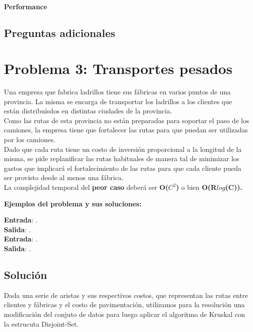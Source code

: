 \documentclass[a4paper, 10pt, twoside]{article}
\begin{document}
\paragraph{Performance}

\subsection{Preguntas adicionales}





\newpage

\section{Problema 3: Transportes pesados}

Una empresa que fabrica ladrillos tiene sus fábricas en varios puntos de una provincia. La misma se encarga de transportar los ladrillos a los clientes que están distribuísdos en distintas ciudades de la provincia.\\
Como las rutas de esta provincia no están preparadas para soportar el paso de los camiones, la empresa tiene que fortalecer las rutas para que puedan ser utilizadas por los camiones.\\
Dado que cada ruta tiene un costo de inversión proporcional a la longitud de la misma, se pide replanificar las rutas habituales de manera tal de minimizar los gastos que implicará el fortalecimiento de las rutas para que cada cliente pueda ser provisto desde al menos una fábrica.\\
La complejidad temporal del \textbf{peor caso} deberá ser \textbf{O($C^2$)} o bien \textbf{O(R$log$(C)).}

\textbf{Ejemplos del problema y sus soluciones:}

\textbf{Entrada}: . \\
\textbf{Salida}: . \\

\textbf{Entrada}: . \\
\textbf{Salida}: . \\

\subsection{Solución}
Dada una serie de aristas y sus respectivos costos, que representan las rutas entre clientes y fábricas y el costo de pavimentación, utilizamos para la resolución una modificación del conjuto de datos para luego aplicar el algoritmo de Kruskal con la estrucuta Disjoint-Set.
\end{document}
